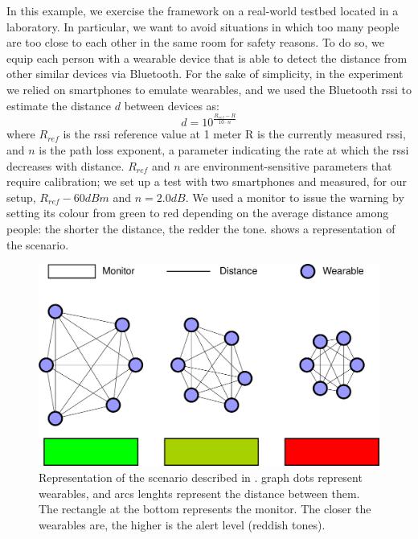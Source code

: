 \documentclass[conference]{IEEEtran}
\providecommand{\decibel}{dB}
\providecommand{\decibelmeter}{dBm}
\providecommand{\qty}[2]{#1#2}
\newcommand{\meta}[1]{{\color{blue}#1}}
\begin{document}
In this example, we exercise the framework on a real-world testbed
located in a laboratory.
%
In particular,
we want to avoid situations in which too many people are too close to each other in the same room for safety reasons.
%
To do so,
we equip each person with a wearable device that is able to detect the distance from other similar devices via Bluetooth.
%
For the sake of simplicity,
in the experiment we relied on smartphones to emulate wearables,
and we used
%
    the Bluetooth \ac{rssi} to estimate the distance $d$ between devices as:
    $$d=10^{\frac{R_{ref} - R}{10 \cdot n}}$$
    where $R_{ref}$ is the \ac{rssi} reference value at 1 meter
    R is the currently measured \ac{rssi},
    and $n$ is the path loss exponent,
    a parameter indicating the rate at which the \ac{rssi} decreases with distance.
    $R_{ref}$ and $n$ are environment-sensitive parameters that require calibration;
    we set up a test with two smartphones and measured,
    for our setup,
    $R_{ref}\qty{-60}{\decibelmeter}$ and $n=\qty{2.0}{\decibel}$.
%
We used a monitor to issue the warning
by setting its colour from green to red depending on the average distance among people:
the shorter the distance, the redder the tone.
%
 shows a representation of the scenario.
%
\begin{figure}
    \centering
    \includegraphics[width=.9\columnwidth]{figures/crow-laboratory-demo.drawio.pdf}
    \caption{
        Representation of the scenario described in .
        graph dots represent wearables,
        and arcs lenghts represent the distance between them.
        The rectangle at the bottom represents the monitor.
        The closer the wearables are, the higher is the alert level
        (reddish tones).
    }
    \label{fig:crowd-alert}
\end{figure}
\end{document}
